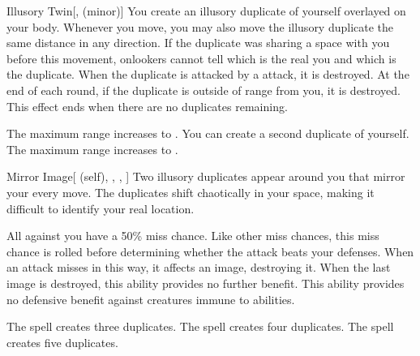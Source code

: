 \lowercase{\hypertarget{spell:Illusory Twin}{}}\label{spell:Illusory Twin}
\begin{freeability}[Rank 1]{\hypertarget{spell:Illusory Twin}{Illusory Twin}}[,  (minor)]
\targetrule
You create an illusory duplicate of yourself overlayed on your body.
Whenever you move, you may also move the illusory duplicate the same distance in any direction.
If the duplicate was sharing a space with you before this movement, onlookers cannot tell which is the real you and which is the duplicate.
When the duplicate is attacked by a  attack, it is destroyed.
At the end of each round, if the duplicate is outside of \rngmed range from you, it is destroyed.
This effect ends when there are no duplicates remaining.

\rankline
{} The maximum range increases to \rnglong.
 You can create a second duplicate of yourself.
 The maximum range increases to \rngext.
\end{freeability}
\vspace{0.25em}



\lowercase{\hypertarget{spell:Mirror Image}{}}\label{spell:Mirror Image}
\begin{attuneability}[Rank 1]{\hypertarget{spell:Mirror Image}{Mirror Image}}[ (self), , , ]
Two illusory duplicates appear around you that mirror your every move.
The duplicates shift chaotically in your space, making it difficult to identify your real location.

All  against you have a 50\% miss chance.
Like other miss chances, this miss chance is rolled before determining whether the attack beats your defenses.
When an attack misses in this way, it affects an image, destroying it.
When the last image is destroyed, this ability provides no further benefit.
This ability provides no defensive benefit against creatures immune to  abilities.

\rankline
{} The spell creates three duplicates.
 The spell creates four duplicates.
 The spell creates five duplicates.
\end{attuneability}
\vspace{0.25em}



